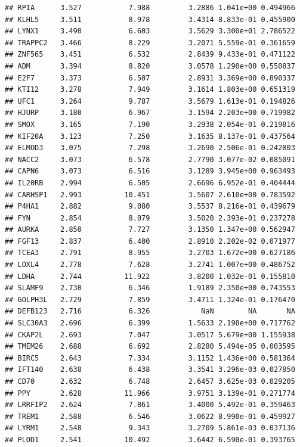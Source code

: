 \documentclass{article}\usepackage[]{graphicx}\usepackage[]{color}
\makeatletter
\newenvironment{kframe}{%
 \def\at@end@of@kframe{}%
 \ifinner\ifhmode%
  \def\at@end@of@kframe{\end{minipage}}%
  \begin{minipage}{\columnwidth}%
 \fi\fi%
 \def\FrameCommand##1{\hskip\@totalleftmargin \hskip-\fboxsep
 \colorbox{shadecolor}{##1}\hskip-\fboxsep
     \hskip-\linewidth \hskip-\@totalleftmargin \hskip\columnwidth}%
 \MakeFramed {\advance\hsize-\width
   \@totalleftmargin\z@ \linewidth\hsize
   \@setminipage}}%
 {\par\unskip\endMakeFramed%
 \at@end@of@kframe}
\newenvironment{knitrout}{}{} %
\makeatother
\begin{document}
\begin{knitrout}
\begin{kframe}
\begin{verbatim}
## RPIA      3.527           7.988         3.2886 1.041e+00 0.494966
## KLHL5     3.511           8.978         3.4314 8.833e-01 0.455900
## LYNX1     3.490           6.603         3.5629 3.300e+01 2.786522
## TRAPPC2   3.466           8.229         3.2071 5.559e-01 0.361659
## ZNF565    3.451           6.532         2.8439 9.433e-01 0.471122
## ADM       3.394           8.820         3.0578 1.290e+00 0.550837
## E2F7      3.373           6.507         2.8931 3.369e+00 0.890337
## KTI12     3.278           7.949         3.1614 1.803e+00 0.651319
## UFC1      3.264           9.787         3.5679 1.613e-01 0.194826
## HJURP     3.180           6.967         3.1594 2.203e+00 0.719982
## SMOX      3.165           7.190         3.2938 2.054e-01 0.219816
## KIF20A    3.123           7.250         3.1635 8.137e-01 0.437564
## ELMOD3    3.075           7.298         3.2690 2.506e-01 0.242803
## NACC2     3.073           6.578         2.7790 3.077e-02 0.085091
## CAPN6     3.073           6.516         3.1289 3.945e+00 0.963493
## IL20RB    2.994           6.505         2.6696 6.952e-01 0.404444
## CARHSP1   2.993          10.451         3.5607 2.610e+00 0.783592
## P4HA1     2.882           9.080         3.5537 8.216e-01 0.439679
## FYN       2.854           8.079         3.5020 2.393e-01 0.237278
## AURKA     2.850           7.727         3.1350 1.347e+00 0.562947
## FGF13     2.837           6.400         2.8910 2.202e-02 0.071977
## TCEA3     2.791           8.955         3.2703 1.672e+00 0.627186
## LOXL4     2.778           7.628         3.2741 1.007e+00 0.486752
## LDHA      2.744          11.922         3.8200 1.032e-01 0.155810
## SLAMF9    2.730           6.346         1.9189 2.350e+00 0.743553
## GOLPH3L   2.729           7.859         3.4711 1.324e-01 0.176470
## DEFB123   2.716           6.326            NaN        NA       NA
## SLC30A3   2.696           6.399         1.5633 2.190e+00 0.717762
## CKAP2L    2.693           7.047         3.0517 5.679e+00 1.155938
## TMEM26    2.688           6.692         2.8280 5.494e-05 0.003595
## BIRC5     2.643           7.334         3.1152 1.436e+00 0.581364
## IFT140    2.638           6.438         3.3541 3.296e-03 0.027850
## CD70      2.632           6.748         2.6457 3.625e-03 0.029205
## PPY       2.628          11.966         3.9751 3.139e-01 0.271774
## LRRFIP2   2.624           7.861         3.4000 5.492e-01 0.359463
## TREM1     2.588           6.546         3.0622 8.990e-01 0.459927
## LYRM1     2.548           9.343         3.2709 5.861e-03 0.037136
## PLOD1     2.541          10.492         3.6442 6.590e-01 0.393765

\end{verbatim}
\end{kframe}
\end{knitrout}
\end{document}
